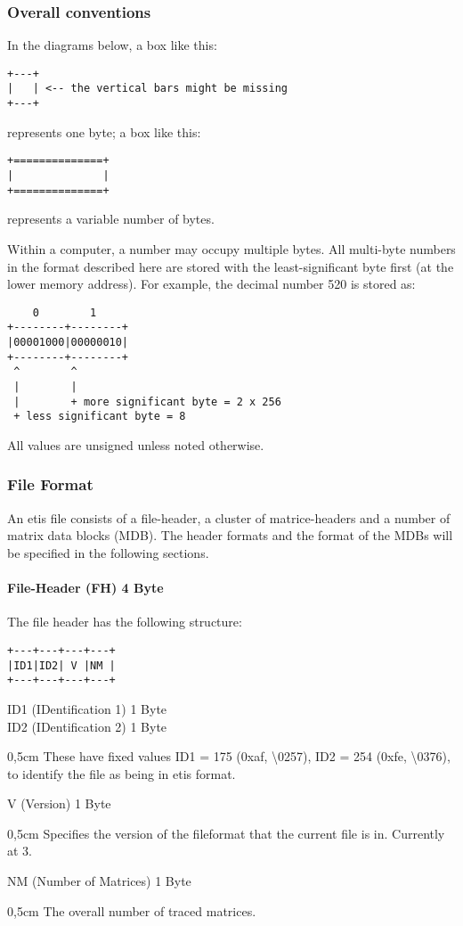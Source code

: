 \subsubsection{Overall conventions}

In the diagrams below, a box like this:
\begin{verbatim}
+---+
|   | <-- the vertical bars might be missing
+---+
\end{verbatim}
represents one byte; a box like this:
\begin{verbatim}
+==============+
|              |
+==============+
\end{verbatim}
represents a variable number of bytes.

Within a computer, a number may occupy multiple bytes. All multi-byte numbers in the format described here are 
stored with the least-significant byte first (at the lower memory address). For example, the decimal number 520 
is stored as:
\begin{verbatim}
    0        1
+--------+--------+
|00001000|00000010|
+--------+--------+
 ^        ^
 |        |
 |        + more significant byte = 2 x 256
 + less significant byte = 8
\end{verbatim}

All values are unsigned unless noted otherwise.

\subsubsection{File Format}

An etis file consists of a file-header, a cluster of matrice-headers and a number of matrix data blocks (MDB). 
The header formats and the format of the MDBs will be specified in the following sections.

\paragraph{File-Header (FH) 4 Byte}$\;$ \\

The file header has the following structure:

\begin{verbatim}
+---+---+---+---+
|ID1|ID2| V |NM |
+---+---+---+---+
\end{verbatim}
ID1 (IDentification 1) 1 Byte \\
ID2 (IDentification 2) 1 Byte
\begin{addmargin}[0,5cm]{0,5cm} 
	These have fixed values ID1 = 175 (0xaf, \textbackslash0257), ID2 = 254 (0xfe, \textbackslash0376), to identify the file as being in etis format.
\end{addmargin} 
V (Version) 1 Byte
\begin{addmargin}[0,5cm]{0,5cm} 
	Specifies the version of the fileformat that the current file is in. Currently at 3.
\end{addmargin}
NM (Number of Matrices) 1 Byte
\begin{addmargin}[0,5cm]{0,5cm} 
	The overall number of traced matrices.
\end{addmargin}

